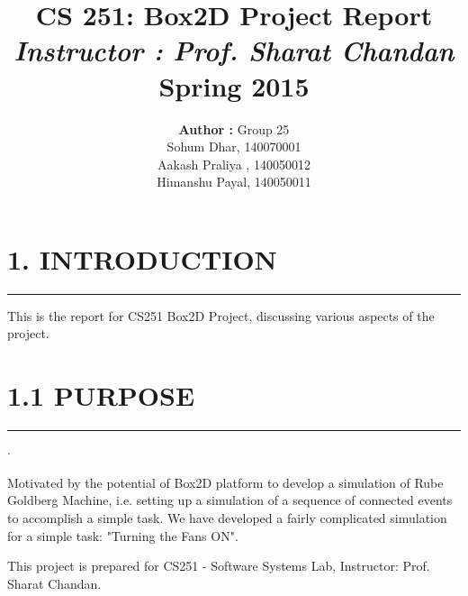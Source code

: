 \documentclass{report}
\title{\textbf{\huge CS 251: Box2D Project Report} \\ \normalsize \emph{ \Large Instructor : Prof. Sharat Chandan } \\ \large Spring 2015}
\author{\Large \textbf{ Author : }Group 25 \\ Sohum Dhar, 140070001 \\ Aakash Praliya , 140050012 \\ Himanshu Payal, 140050011 }
\begin{document}
\maketitle

\renewcommand*\sectionmark[1]{\markboth{#1}{}}
\renewcommand*\subsectionmark[1]{\markright{#1}}
\newcommand{\tab}[2]{\hspace{0em}\rlap{#1}\hspace{0.245\textwidth}\rlap{#2}}
\newenvironment{rSection}[1]
{ \MakeUppercase{\bf \large #1}
  \bigskip  \hrule
  \begin{list}{}{ \setlength{\leftmargin}{1.5em} }
  \item[]
}
{ \end{list}
  \pagebreak}
\newenvironment{rSubsection}[4]{
  {\bf #1} \hfill { #2}
  \ifthenelse{\equal{#3}{}}{}{
  \\
  {\em #3} \hfill {\em #4}
  }\smallskip
  \begin{list}{$\cdot$}{\leftmargin=0em}
  \itemsep -0.5em \vspace{-0.5em}
  }{\end{list}
  \vspace{0.5em}
}

\section*{\huge 1. INTRODUCTION}
\hrule
This is the report for CS251 Box2D Project, discussing various aspects of the project. 
\\
\section*{1.1 PURPOSE}
\hrule
\large
\begin{list}{$\cdot$}{\setlength{\leftmargin}{0em}}
\item Motivated by the potential of Box2D platform to develop a simulation of Rube Goldberg Machine, i.e. setting up a simulation of a sequence of connected events to accomplish a simple task. We have developed a fairly complicated simulation for a simple task: "Turning the Fans ON".
\item This project is prepared for CS251 - Software Systems Lab, Instructor: Prof. Sharat Chandan.
\end{list}
\end{document}
